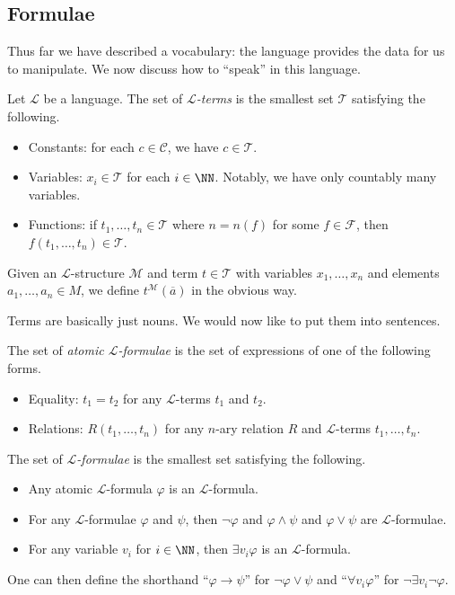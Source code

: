 \documentclass[../notes.tex]{subfiles}
\begin{document}
\subsection{Formulae}
Thus far we have described a vocabulary: the language provides the data for us to manipulate. We now discuss how to ``speak'' in this language.
\begin{definition}[term]
	Let $\mathcal L$ be a language. The set of \textit{$\mathcal L$-terms} is the smallest set $\mathcal T$ satisfying the following.
	\begin{itemize}
		\item Constants: for each $c\in\mathcal C$, we have $c\in\mathcal T$.
		\item Variables: $x_i\in\mathcal T$ for each $i\in\NN$. Notably, we have only countably many variables.
		\item Functions: if $t_1,\ldots,t_n\in\mathcal T$ where $n=n(f)$ for some $f\in\mathcal F$, then $f(t_1,\ldots,t_n)\in\mathcal T$.
	\end{itemize}
	Given an $\mathcal L$-structure $\mathcal M$ and term $t\in\mathcal T$ with variables $x_1,\ldots,x_n$ and elements $a_1,\ldots,a_n\in M$, we define $t^\mathcal M(\overline a)$ in the obvious way.
\end{definition}
Terms are basically just nouns. We would now like to put them into sentences.
\begin{definition}
	The set of \textit{atomic $\mathcal L$-formulae} is the set of expressions of one of the following forms.
	\begin{itemize}
		\item Equality: $t_1=t_2$ for any $\mathcal L$-terms $t_1$ and $t_2$.
		\item Relations: $R(t_1,\ldots,t_n)$ for any $n$-ary relation $R$ and $\mathcal L$-terms $t_1,\ldots,t_n$.
	\end{itemize}
\end{definition}
\begin{definition}[formula]
	The set of \textit{$\mathcal L$-formulae} is the smallest set satisfying the following.
	\begin{itemize}
		\item Any atomic $\mathcal L$-formula $\varphi$ is an $\mathcal L$-formula.
		\item For any $\mathcal L$-formulae $\varphi$ and $\psi$, then $\lnot\varphi$ and $\varphi\land\psi$ and $\varphi\lor\psi$ are $\mathcal L$-formulae.
		\item For any variable $v_i$ for $i\in\NN$, then $\exists v_i\varphi$ is an $\mathcal L$-formula.
	\end{itemize}
\end{definition}
One can then define the shorthand ``$\varphi\to\psi$'' for $\lnot\varphi\lor\psi$ and ``$\forall v_i\varphi$'' for $\lnot\exists v_i\lnot\varphi$.
\end{document}
